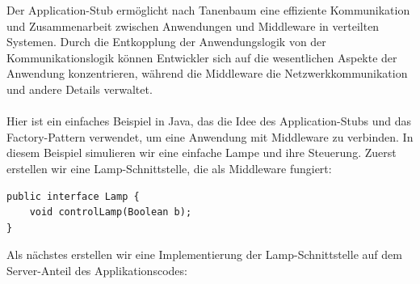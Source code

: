 Der Application-Stub ermöglicht nach Tanenbaum eine effiziente Kommunikation und Zusammenarbeit zwischen Anwendungen und Middleware in verteilten Systemen. Durch die Entkopplung der Anwendungslogik von der Kommunikationslogik können Entwickler sich auf die wesentlichen Aspekte der Anwendung konzentrieren, während die Middleware die Netzwerkkommunikation und andere Details verwaltet.
\\\\
Hier ist ein einfaches Beispiel in Java, das die Idee des Application-Stubs und das Factory-Pattern verwendet, um eine Anwendung mit Middleware zu verbinden. In diesem Beispiel simulieren wir eine einfache Lampe und ihre Steuerung.
Zuerst erstellen wir eine Lamp-Schnittstelle, die als Middleware fungiert:\\
\noindent\begin{minipage}{\textwidth}
\begin{lstlisting}[caption={RPC Interface},captionpos=b,label={lst:rpc-interface}]
public interface Lamp {
    void controlLamp(Boolean b);
}
\end{lstlisting}
\end{minipage}
Als nächstes erstellen wir eine Implementierung der Lamp-Schnittstelle auf dem Server-Anteil des Applikationscodes:\\

